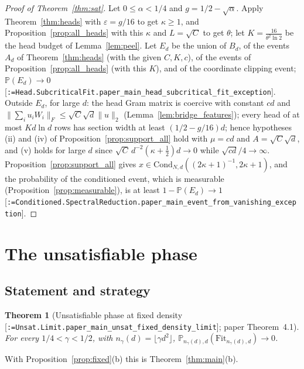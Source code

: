 \documentclass[11pt]{article}
\makeatletter
\newcommand{\formal@break}[1]{\@tfor\formal@tok:=#1\do{%
  \formal@tok
  \expandafter\ifx\formal@tok.\allowbreak\else
  \expandafter\ifx\formal@tok\_\allowbreak\fi\fi}}
\DeclareRobustCommand{\formal}[1]{\textnormal{[\texttt{\small\formal@break{#1}}]}}
\newcommand{\Prob}{\mathbb{P}}
\newcommand{\norm}[1]{\lVert #1\rVert}
\newcommand{\Fro}{F}
\newcommand{\sqd}{\sqrt{d}}
\newcommand{\Fit}{\mathrm{Fit}}
\newcommand{\Cond}{\mathrm{Cond}}
\theoremstyle{plain}
\newtheorem{theorem}{Theorem}[section]
\theoremstyle{definition}
\makeatother
\begin{document}
\begin{proof}[Proof of Theorem~\ref{thm:sat}]
Let $0 \le \alpha < 1/4$ and $g = 1/2 - \sqrt\alpha$. Apply
Theorem~\ref{thm:heads} with $\varepsilon = g/16$ to get $\kappa \ge 1$, and
Proposition~\ref{prop:all_heads} with this $\kappa$ and $L = \sqrt C$ to get
$\theta$; let $K = \frac{16}{\theta^2\ln2}$ be the head budget of
Lemma~\ref{lem:peel}. Let $E_d$ be the union of $B_d$, of the events $A_d$
of Theorem~\ref{thm:heads} (with the given $C, K, c$), of the events of
Proposition~\ref{prop:all_heads} (with this $K$), and of the coordinate
clipping event; $\Prob(E_d) \to 0$ \formal{Head.SubcriticalFit.paper\_main\_head\_subcritical\_fit\_exception}.
Outside $E_d$, for large $d$: the head Gram matrix is coercive with
constant $cd$ and $\norm{\sum_iu_iW_i}_\Fro \le \sqrt C\sqd\norm{u}_2$
(Lemma~\ref{lem:bridge_features}); every head of at most $Kd\ln d$ rows has
section width at least $(1/2 - g/16)d$; hence hypotheses (ii) and (iv) of
Proposition~\ref{prop:support_all} hold with $\mu = cd$ and $A = \sqrt C\sqd$,
and (v) holds for large $d$ since $\sqrt C\,d^{-2}(\kappa + \frac12)d \to 0$
while $\sqrt{cd}/4 \to \infty$. Proposition~\ref{prop:support_all} gives
$x \in \Cond_{N,d}((2\kappa+1)^{-1}, 2\kappa+1)$, and the probability of the
conditioned event, which is measurable (Proposition~\ref{prop:measurable}),
is at least $1 - \Prob(E_d) \to 1$
\formal{Conditioned.SpectralReduction.paper\_main\_event\_from\_vanishing\_exception}.
\end{proof}

\section{The unsatisfiable phase}\label{sec:unsat}

\subsection{Statement and strategy}

\begin{theorem}[Unsatisfiable phase at fixed density \formal{Unsat.Limit.paper\_main\_unsat\_fixed\_density\_limit}; paper Theorem~4.1]\label{thm:unsat}
For every $1/4 < \gamma < 1/2$, with $n_\gamma(d) = \lfloor\gamma d^2\rfloor$,
$\Prob_{n_\gamma(d),d}(\Fit_{n_\gamma(d),d}) \to 0$.
\end{theorem}

With Proposition~\ref{prop:fixed}(b) this is Theorem~\ref{thm:main}(b).
\end{document}
